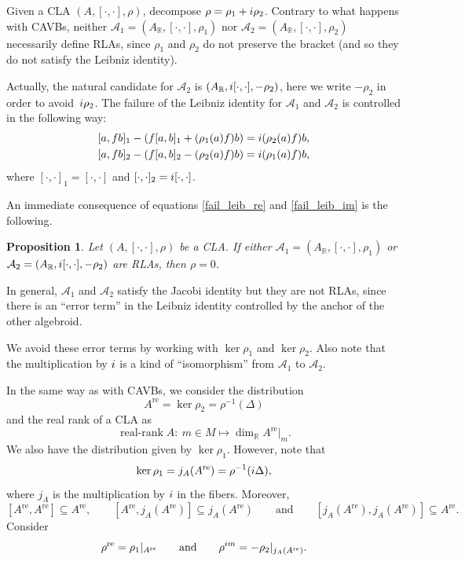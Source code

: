 \documentclass[11pt]{article}
\numberwithin{equation}{section}
\numberwithin{equation}{section}
\newtheorem{Proposition}[Theorem]{Proposition}
 { \theoremstyle{definition}
\newtheorem{Definition}[Theorem]{Definition}
\newtheorem{Note}[Theorem]{Note}
\newtheorem{Example}[Theorem]{Example}
\newtheorem{Examples}[Theorem]{Examples}
\newtheorem{Remark}[Theorem]{Remark} }
\newcommand{\R}{{\mathbb{R}}}
\DeclareMathOperator{\real}{re}
\begin{document}
Given a CLA $(A, [\cdot,\cdot], \rho)$, decompose $\rho=\rho_1+{\rm i}\rho_2$. Contrary to what happens with CAVBs, neither $\mathcal{A}_1=(A_{\R}, [\cdot,\cdot], \rho_1)$ nor $\mathcal{A}_2=(A_{\R}, [\cdot,\cdot],\rho_2)$ necessarily define RLAs, since $\rho_1$ and $\rho_2$ do not preserve the bracket (and so they do not satisfy the Leibniz identity).


Actually, the natural candidate for $\mathcal{A}_2$ is $(A_{\R}, {\rm i}[\cdot,\cdot], -\rho_2)$, here we write $-\rho_2$ in order to avoid~${\rm i}\rho_2$. The failure of the Leibniz identity for $\mathcal{A}_1$ and $\mathcal{A}_2$ is controlled in the following way:
  \begin{gather}\label{fail_leib_re}
  [a, fb]_1-(f[a,b]_1+(\rho_1(a)f)b)={\rm i}(\rho_2(a)f)b,
  \\ \label{fail_leib_im}
  [a, fb]_2-(f[a,b]_2-(\rho_2(a)f)b)={\rm i}(\rho_1(a)f)b,
  \end{gather}
  where $[\cdot,\cdot]_1=[\cdot,\cdot]$ and $[\cdot,\cdot]_2={\rm i}[\cdot,\cdot]$.

An immediate consequence of equations \eqref{fail_leib_re} and \eqref{fail_leib_im} is the following.
\begin{Proposition}
Let $(A, [\cdot,\cdot], \rho)$ be a CLA. If either $\mathcal{A}_1=(A_{\R}, [\cdot,\cdot], \rho_1)$ or $\mathcal{A}_2=(A_{\R}, {\rm i}[\cdot,\cdot], -\rho_2)$ are RLAs, then $\rho=0$.
\end{Proposition}

In general, $\mathcal{A}_1$ and $\mathcal{A}_2$ satisfy the Jacobi identity but they are not RLAs, since there is an ``error term'' in the Leibniz identity controlled by the anchor of the other algebroid.

We avoid these error terms by working with $\ker\rho_1$ and $\ker\rho_2$. Also note that the multiplication by ${\rm i}$ is a kind of ``isomorphism'' from $\mathcal{A}_1$ to $\mathcal{A}_2$.

In the same way as with CAVBs, we consider the distribution
\[
A^{\real}=\ker \rho_2=\rho^{-1}(\Delta)
\]
and the real rank of a CLA as
\[\operatorname{\text{real-rank}} A\colon \ m\in M\mapsto \dim_{\R} A^{\real}|_m.\]
We also have the distribution given by $\ker\rho_1$. However, note that
\[\ker\rho_1=j_A(A^{\real})=\rho^{-1}({\rm i}\Delta),\]
 where $j_A$ is the multiplication by ${\rm i}$ in the fibers. Moreover,
\begin{equation}\label{id_1}
[A^{\real}, A^{\real}]\subseteq A^{\real},\qquad[A^{\real}, j_A(A^{\real})]\subseteq j_A(A^{\real})\qquad\text{and}\qquad [j_A(A^{\real}), j_A(A^{\real})]\subseteq A^{\real}.
\end{equation}
 Consider
 \[\rho^{\real}=\rho_1|_{A^{\real}}\qquad \text{and}\qquad \rho^{{\rm im}}=-\rho_2|_{j_A(A^{\real})}.\]
\end{document}
